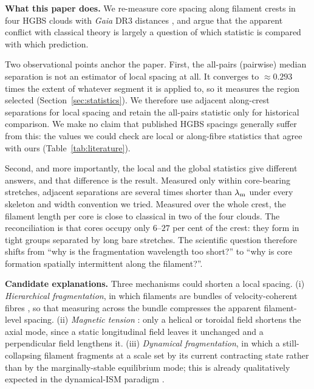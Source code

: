 \documentclass[usenatbib,twoside,twocolumn]{mnras}
\begin{document}
\smallskip\noindent\textbf{What this paper does.} We re-measure core spacing along filament crests in four HGBS clouds with \textit{Gaia} DR3 distances \citep{Zhang2023}, and argue that the apparent conflict with classical theory is largely a question of which statistic is compared with which prediction.

Two observational points anchor the paper. First, the all-pairs (pairwise) median separation is not an estimator of local spacing at all. It converges to $\approx0.293$ times the extent of whatever segment it is applied to, so it measures the region selected (Section~\ref{sec:statistics}). We therefore use adjacent along-crest separations for local spacing and retain the all-pairs statistic only for historical comparison. We make no claim that published HGBS spacings generally suffer from this: the values we could check are local or along-fibre statistics that agree with ours (Table~\ref{tab:literature}).

Second, and more importantly, the local and the global statistics give different answers, and that difference is the result. Measured only within core-bearing stretches, adjacent separations are several times shorter than $\lambda_{\rm m}$ under every skeleton and width convention we tried. Measured over the whole crest, the filament length per core is close to classical in two of the four clouds. The reconciliation is that cores occupy only $6$--$27$ per cent of the crest: they form in tight groups separated by long bare stretches. The scientific question therefore shifts from ``why is the fragmentation wavelength too short?'' to ``why is core formation spatially intermittent along the filament?''.

\smallskip\noindent\textbf{Candidate explanations.} Three mechanisms could shorten a local spacing. (i) \emph{Hierarchical fragmentation}, in which filaments are bundles of velocity-coherent fibres \citep{Hacar2013,Hacar2018,Yang2024}, so that measuring across the bundle compresses the apparent filament-level spacing. (ii) \emph{Magnetic tension} \citep{Nakamura1993}: only a helical or toroidal field shortens the axial mode, since a static longitudinal field leaves it unchanged and a perpendicular field lengthens it. (iii) \emph{Dynamical fragmentation}, in which a still-collapsing filament fragments at a scale set by its current contracting state rather than by the marginally-stable equilibrium mode; this is already qualitatively expected in the dynamical-ISM paradigm \citep{Andre2014,Clarke2016,Clarke2017,Clarke2020}.
\end{document}
